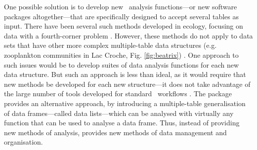 \documentclass[a4paper]{report}
\begin{document}
\begin{article}
One possible solution is to develop new \R\ analysis functions---or new software packages altogether---that are specifically designed to accept several tables as input.  There have been several such methods developed in ecology, focusing on data with a fourth-corner problem \citep{DoledecEtAl1996,LegendreEtAl1997,DrayAndLegendre2008,PillarEtAl2010,LeiboldEtAl2010,IvesAndHelmus2011}.  However, these methods do not apply to data sets that have other more complex multiple-table data structures (e.g. zooplankton communities in Lac Croche, Fig. \ref{fig:beatrix}) \citep{CantinEtAl2011}.  One approach to such issues would be to develop suites of data analysis functions for each new data structure.  But such an approach is less than ideal, as it would require that new methods be developed for each new structure---it does not take advantage of the large number of tools developed for standard \R\ workflows \citep{ChambersAndHastie1992}.  The  package provides an alternative approach, by introducing a multiple-table generalisation of data frames---called data lists---which can be analysed with virtually any function that can be used to analyse a data frame.  Thus, instead of providing new methods of analysis,  provides new methods of data management and organisation.


\end{article}
\end{document}
